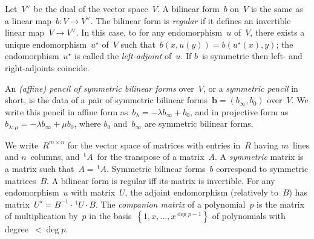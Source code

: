 \documentclass{lms}%
\def\transpose{\,{}^{\mathrm{t}\!}}
\def\acco#1{\left\{#1\right\}}
\begin{document}
Let~$V^{∨}$ be the dual of the vector space~$V$. A bilinear form~$b$
on~$V$ is the same as a linear map~$b: V → V^{∨}$. The bilinear form is
\emph{regular} if it defines an invertible linear map~$V → V^{∨}$. In
this case, to for any endomorphism~$u$ of~$V$, there exists a unique
endomorphism~$u^{⋆}$ of~$V$ such that~$b(x,u(y)) = b(u^{⋆}(x), y)$; the
endomorphism~$u^{⋆}$ is called the \emph{left-adjoint} of~$u$. If $b$~is
symmetric then left- and right-adjoints coincide.

An \emph{(affine) pencil of symmetric bilinear
forms} over~$V$, or a \emph{symmetric pencil} in short, is the data of a
pair of symmetric bilinear forms~$\bm{b} = (b_{∞}, b_{0})$ over~$V$. We
write this pencil in affine form as~$b_{λ} = -λ b_{∞} + b_{0}$, and in
projective form as~$b_{λ:μ} = -λ b_{∞} + μ b_{0}$, where $b_{0}$
and~$b_{∞}$ are symmetric bilinear forms.


\medbreak

We write~$R^{m×n}$ for the vector space of matrices with entries in~$R$
having $m$~lines and $n$~columns, and $\transpose{A}$~for the transpose
of a matrix~$A$. A \emph{symmetric} matrix is a matrix such that~$A =
\transpose{A}$. Symmetric bilinear forms~$b$ correspond to symmetric
matrices~$B$. A bilinear form is regular iff its matrix is invertible.
For any endomorphism~$u$ with matrix~$U$, the adjoint endomorphism
(relatively to~$B$) has matrix~$U^{⋆} = B^{-1} · \transpose{U} · B$. The
\emph{companion matrix} of a polynomial~$p$ is the matrix of
multiplication by~$p$ in the basis~$\acco{1,x,…,x^{\deg p-1}}$ of
polynomials with degree~$< \deg p$.

\end{document}
